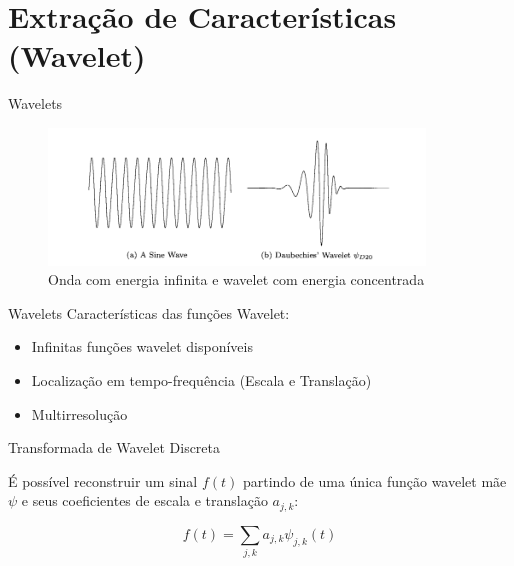 \documentclass[10pt]{beamer}
\begin{document}
\section*{Extração de Características (Wavelet)}


\begin{frame} {Wavelets}
  \begin{figure}[]
    \centering
    \includegraphics[width=10cm]{images/waveAndWavelet.png}
    \caption{Onda com energia infinita e wavelet com energia concentrada \cite{burrus_introduction_1998}}
  \end{figure}
\end{frame}

\begin{frame} {Wavelets}
  Características das funções Wavelet:
  \begin{itemize}
    \item Infinitas funções wavelet disponíveis
    \item Localização em tempo-frequência (Escala e Translação)
    \item Multirresolução
  \end{itemize}
\end{frame}

\begin{frame}{Transformada de Wavelet Discreta}

  É possível reconstruir um sinal $f(t)$ partindo de uma 
  única função wavelet mãe $\psi$ e seus coeficientes de escala e translação $a_{j, k}$:

  \begin{equation}
    f(t) = \sum_{j, k} a_{j, k} \psi_{j, k} (t)
    \nonumber
  \end{equation}
  
\end{frame}


\end{document}
